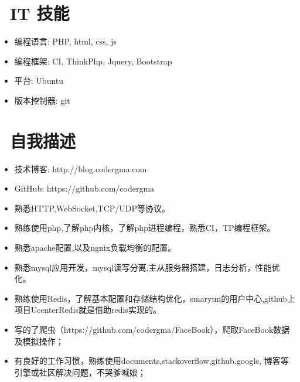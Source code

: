\documentclass{resume}
\begin{document}
\section{\faCogs\ IT 技能}
\begin{itemize}[parsep=0.5ex]
  \item 编程语言: PHP, html, css, js
  \item 编程框架: CI, ThinkPhp, Jquery, Bootstrap  
  \item 平台: Ubuntu
  \item 版本控制器: git
\end{itemize}

\section{\faHeartO\ 自我描述}
\begin{itemize}
  \item 技术博客: http://blog.codergma.com
  \item GitHub: https://github.com/codergma
  \item 熟悉HTTP,WebSocket,TCP/UDP等协议。
  \item 熟练使用php,了解php内核，了解php进程编程，熟悉CI，TP编程框架。
  \item 熟悉apache配置,以及ngnix负载均衡的配置。
  \item 熟悉mysql应用开发，mysql读写分离,主从服务器搭建，日志分析，性能优化。
  \item 熟练使用Redis，了解基本配置和存储结构优化，smaryun的用户中心,github上项目UcenterRedis就是借助redis实现的。
  \item 写的了爬虫（https://github.com/codergma/FaceBook），爬取FaceBook数据及模拟操作；
  \item 有良好的工作习惯，熟练使用documents,stackoverflow,github,google, 博客等引擎或社区解决问题，不哭爹喊娘；
\end{itemize}



%
%
\end{document}
